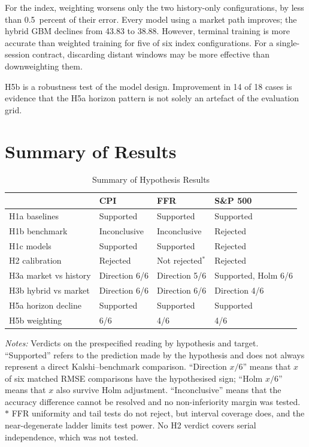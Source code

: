 \documentclass[12pt,a4paper]{report}
\newcommand{\tablenote}[1]{%
  \par\vspace{0.4em}%
  \begin{minipage}{0.9\textwidth}%
  \footnotesize\raggedright\emph{Notes:} #1%
  \end{minipage}%
}
\begin{document}
For the index, weighting worsens only the two history-only configurations, by
less than 0.5~percent of their error. Every model using a market path improves;
the hybrid GBM declines from 43.83 to 38.88. However, terminal training is more
accurate than weighted training for five of six index configurations. For a
single-session contract, discarding distant windows may be more effective than
downweighting them.

H5b is a robustness test of the model design. Improvement in 14 of 18 cases is
evidence that the H5a horizon pattern is not solely an artefact of the
evaluation grid.

\clearpage
\section{Summary of Results}
\label{sec:results-summary}

\begin{table}[htbp]
\centering
\caption{Summary of Hypothesis Results}
\label{tab:results-summary}
\small
\begin{tabular}{@{}llll@{}}
\toprule
 & CPI & FFR & S\&P 500 \\
\midrule
H1a baselines & Supported & Supported & Supported \\
H1b benchmark & Inconclusive & Inconclusive & Rejected \\
H1c models & Supported & Supported & Rejected \\
H2 calibration & Rejected & Not rejected$^\ast$ & Rejected \\
H3a market vs history & Direction 6/6 & Direction 5/6 & Supported, Holm 6/6 \\
H3b hybrid vs market & Direction 6/6 & Direction 6/6 & Direction 4/6 \\
H5a horizon decline & Supported & Supported & Supported \\
H5b weighting & 6/6 & 4/6 & 4/6 \\
\bottomrule
\end{tabular}
\tablenote{Verdicts on the prespecified reading by hypothesis and target.
``Supported'' refers to the prediction made by the hypothesis and does not
always represent a direct Kalshi--benchmark comparison. ``Direction $x/6$''
means that $x$ of six matched RMSE comparisons have the hypothesised sign;
``Holm $x/6$'' means that $x$ also survive Holm adjustment.
``Inconclusive'' means that the accuracy difference cannot be resolved and no
non-inferiority margin was tested. $\ast$ FFR uniformity and tail tests do not
reject, but interval coverage does, and the near-degenerate ladder limits test
power. No H2 verdict covers serial independence, which was not tested.}
\end{table}
\end{document}
